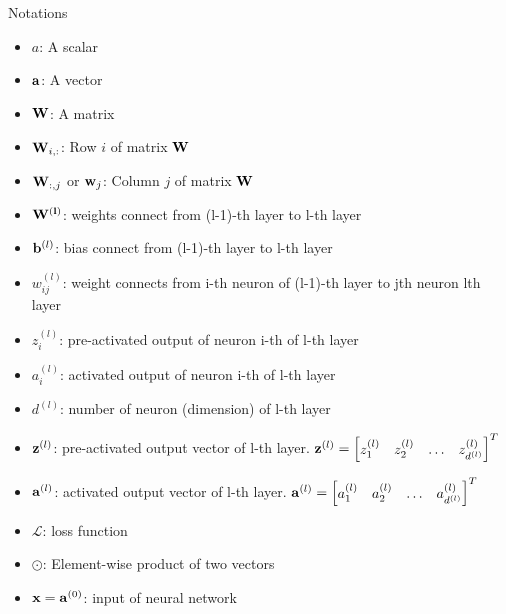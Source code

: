 \documentclass[10pt]{beamer}
\theoremstyle{remark}
\theoremstyle{definition}
\begin{document}
\begin{frame}[allowframebreaks]{Notations}
	\begin{itemize}
		\item $a$: A scalar
  		\item $\bold{a}$: A vector
    	\item $\bold{W}$: A matrix
     	\item $\bold{W}_{i,:}$: Row $i$ of matrix $\bold{W}$
      	\item $\bold{W}_{:,j}$ or $\bold{w}_j$: Column $j$ of matrix $\bold{W}$
       	\item $\bold{W^{(l)}}$: weights connect from (l-1)-th layer to l-th layer
        \item $\bold{b}^{(l)}$: bias connect from (l-1)-th layer to l-th layer
        \item $w_{ij}^{(l)}$: weight connects from i-th neuron of (l-1)-th layer to jth neuron lth layer
        \item $z_{i}^{(l)}$: pre-activated output of neuron i-th of l-th layer
        \item $a_{i}^{(l)}$: activated output of neuron i-th of l-th layer
        \item $d^{(l)}$: number of neuron (dimension) of l-th layer
        \item $\bold{z}^{(l)}$: pre-activated output vector of l-th layer. $\bold{z}^{(l)} = \begin{bmatrix} z_1^{(l)} & z_2^{(l)} & \dots & z_{d^{(l)}}^{(l)}\end{bmatrix}^T$
        \item $\bold{a}^{(l)}$: activated output vector of l-th layer. $\bold{a}^{(l)} = \begin{bmatrix} a_1^{(l)} & a_2^{(l)} &\dots & a_{d^{(l)}}^{(l)}\end{bmatrix}^T$
        \item $\mathcal{L}$: loss function
        \item $\odot$: Element-wise product of two vectors
        \item $\bold{x}=\bold{a}^{(0)}$: input of neural network
	\end{itemize}

\end{frame}
\end{document}
